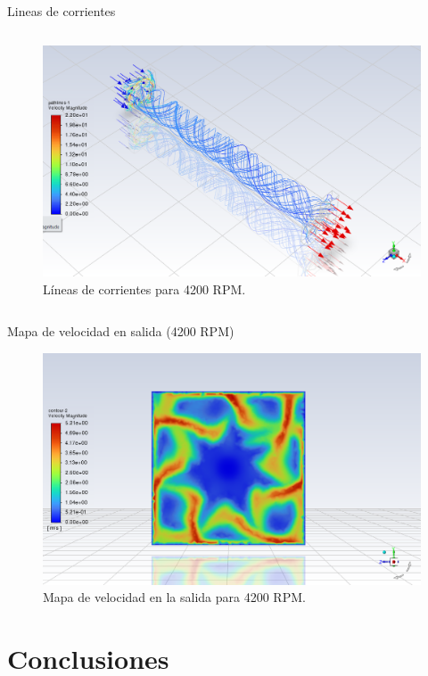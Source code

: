 \begin{frame}{Lineas de corrientes}
\begin{columns}
\begin{block}{}
        \begin{figure}[ht!]
            \centering
            \includegraphics[width=\linewidth]{dump/cor3.png}
            \caption{Líneas de corrientes para 4200 RPM.}
        \end{figure}
    \end{block}
    \end{columns}
\end{frame}

\begin{frame}{Mapa de velocidad en salida (4200 RPM)}
    \begin{block}{}
        \begin{figure}[ht!]
            \centering
            \includegraphics[width=0.6\linewidth]{dump/sal3.png}
            \caption{Mapa de velocidad en la salida para 4200 RPM.}
        \end{figure}
    \end{block}
\end{frame}

\section{Conclusiones}

